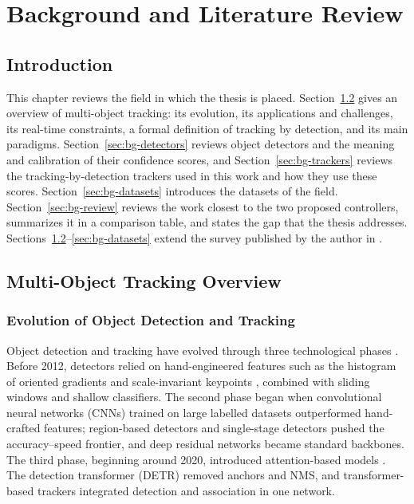 \chapter{Background and Literature Review}\label{ch:background}

\section{Introduction}\label{sec:bg-intro}
This chapter reviews the field in which the thesis is placed. Section~\ref{sec:bg-mot} gives an overview of multi-object tracking: its evolution, its applications and challenges, its real-time constraints, a formal definition of tracking by detection, and its main paradigms. Section~\ref{sec:bg-detectors} reviews object detectors and the meaning and calibration of their confidence scores, and Section~\ref{sec:bg-trackers} reviews the tracking-by-detection trackers used in this work and how they use these scores. Section~\ref{sec:bg-datasets} introduces the datasets of the field. Section~\ref{sec:bg-review} reviews the work closest to the two proposed controllers, summarizes it in a comparison table, and states the gap that the thesis addresses. Sections~\ref{sec:bg-mot}--\ref{sec:bg-datasets} extend the survey published by the author in \cite{ismail2026realtime}.

\section{Multi-Object Tracking Overview}\label{sec:bg-mot}

\subsection{Evolution of Object Detection and Tracking}\label{sec:bg-evolution}
Object detection and tracking have evolved through three technological phases \cite{li2025motreview}. Before 2012, detectors relied on hand-engineered features such as the histogram of oriented gradients \cite{dalal2005hog} and scale-invariant keypoints \cite{lowe2004sift}, combined with sliding windows and shallow classifiers. The second phase began when convolutional neural networks (CNNs) trained on large labelled datasets \cite{krizhevsky2017alexnet,russakovsky2015imagenet} outperformed hand-crafted features; region-based detectors \cite{girshick2014rcnn,ren2017fasterrcnn} and single-stage detectors \cite{redmon2016yolo,liu2016ssd} pushed the accuracy--speed frontier, and deep residual networks \cite{he2016resnet} became standard backbones. The third phase, beginning around 2020, introduced attention-based models \cite{vaswani2017attention,dosovitskiy2021vit}. The detection transformer (DETR) \cite{carion2020detr} removed anchors and NMS, and transformer-based trackers \cite{sun2020transtrack,meinhardt2022trackformer,zeng2022motr} integrated detection and association in one network.

